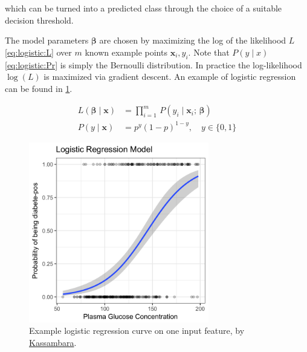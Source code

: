 \noindent which can be turned into a predicted class through the choice of a suitable decision threshold.

The model parameters $\bm{\beta}$ are chosen by maximizing
the log of the likelihood $L$ \cref{eq:logistic:L} over $m$ known example points $\mathbf{x}_{i}, y_{i}$.
Note that $P\left(y \mid x\right)$ \cref{eq:logistic:Pr} is simply the Bernoulli distribution.
In practice the log-likelihood $\log\left(L\right)$ is maximized via gradient descent.
An example of logistic regression can be found in \cref{fig:logistic_regression_ex}.

\begin{subequations} \label{eq:logistic:L_Pr}
\begin{align}
L\left(\bm{\beta} \mid \mathbf{x}\right) &= \prod_{i=1}^{m} \, P\left(y_{i} \mid \mathbf{x}_{i};\,\bm{\beta}\right) \label{eq:logistic:L} \\
P\left(y \mid \mathbf{x}\right) &= p^y\left(1-p\right)^{1-y}, \quad y \in \{0, 1\} \label{eq:logistic:Pr}
\end{align}
\end{subequations}

\begin{figure}
\centering
\includegraphics[width=0.7\textwidth]{figures/regression/logistic-regression-probabilities-curve.png}
\caption{
Example logistic regression curve on one input feature, by \href{http://www.sthda.com/english/articles/36-classification-methods-essentials/151-logistic-regression-essentials-in-r/}{Kassambara}.
}
\label{fig:logistic_regression_ex}
\end{figure}


